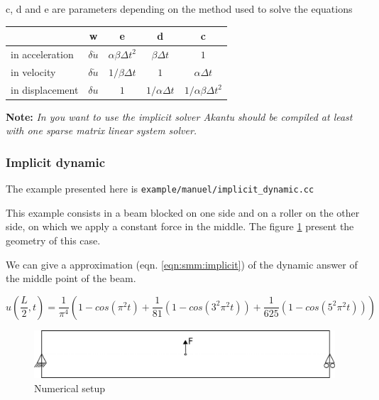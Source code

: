\documentclass[a4paper,11pt]{book}
\newcommand{\code}[1]{{\tt{#1}}}
\newcommand{\note}[1]{\textbf{Note: }\textit{#1}}
\begin{document}
c, d and e are parameters depending on the method used to solve the equations

\begin{center}
  \begin{tabular}{l|c|c|c|c}
    & w & e & d & c\\
    \hline
    in acceleration &$ \delta \ddot{u}$ & $\alpha \beta \Delta t^2$ &$\beta \Delta t$ &$1$\\
    in velocity & $ \delta \dot{u}$& $1/\beta \Delta t$ & $1$ & $\alpha \Delta t$\\
    in displacement &$\delta u$ & $ 1$ & $1/\alpha \Delta t$ & $1/\alpha \beta \Delta t^2$
  \end{tabular}
\end{center}

\note{In you want to use the  implicit solver Akantu should be compiled at least
  with one sparse matrix linear system solver.}


\subsubsection{Implicit dynamic}
The example presented here is \code{example/manuel/implicit\_dynamic.cc}

This example consists in a beam blocked on one side and on a roller on the other
side,  on  which   we  apply  a  constant  force  in   the  middle.  The  figure
\ref{fig:smm:implicit:dynamic} present the geometry of this case.

We can give a approximation  (eqn. \ref{eqn:smm:implicit}) of the dynamic answer
of the middle point of the beam.

\begin{equation}
  u(\frac{L}{2}, t) = \frac{1}{\pi^4} (1 - cos(\pi^2 t) +
  \frac{1}{81}(1 - cos(3^2 \pi^2 t)) +
  \frac{1}{625}(1 - cos(5^2 \pi^2 t)))
\end{equation}
\label{eqn:smm:implicit}

\begin{figure}[!htb]
  \centering
  \includegraphics[scale=.6]{figures/implicit_dynamic}
  \caption{Numerical setup}
  \label{fig:smm:implicit:dynamic}
\end{figure}
\end{document}
